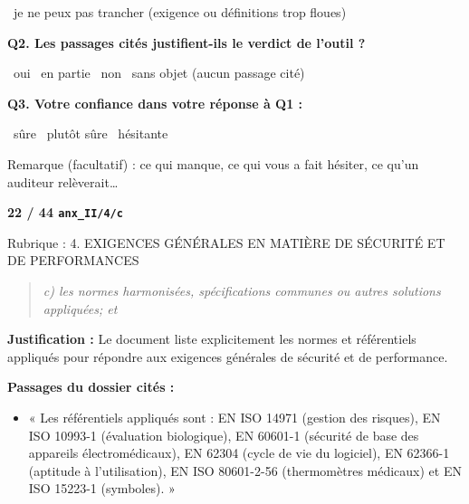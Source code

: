 \documentclass[11pt,a4paper]{article}
\newcommand{\rub}[1]{\par\medskip{\bfseries\color{gris}#1}\par}
\begin{document}
\begin{Form}
\CheckBox[name=u21_indecis,width=1.05em,height=1.05em,bordercolor={0 0 0},borderwidth=1]{}~je ne peux pas trancher (exigence ou définitions trop floues)\par
\textbf{Q2. Les passages cités justifient-ils le verdict de l'outil ?}\par
\CheckBox[name=u21_cit_oui,width=1.05em,height=1.05em,bordercolor={0 0 0},borderwidth=1]{}~oui \quad \CheckBox[name=u21_cit_partiel,width=1.05em,height=1.05em,bordercolor={0 0 0},borderwidth=1]{}~en partie \quad \CheckBox[name=u21_cit_non,width=1.05em,height=1.05em,bordercolor={0 0 0},borderwidth=1]{}~non \quad \CheckBox[name=u21_cit_sans,width=1.05em,height=1.05em,bordercolor={0 0 0},borderwidth=1]{}~sans objet (aucun passage cité)\par
\textbf{Q3. Votre confiance dans votre réponse à Q1 :}\par
\CheckBox[name=u21_conf_sure,width=1.05em,height=1.05em,bordercolor={0 0 0},borderwidth=1]{}~sûre \quad \CheckBox[name=u21_conf_plutot,width=1.05em,height=1.05em,bordercolor={0 0 0},borderwidth=1]{}~plutôt sûre \quad \CheckBox[name=u21_conf_hesitante,width=1.05em,height=1.05em,bordercolor={0 0 0},borderwidth=1]{}~hésitante\par
Remarque (facultatif) : ce qui manque, ce qui vous a fait hésiter, ce qu'un auditeur relèverait\ldots\par
\TextField[name=u21_note,multiline=true,width=\linewidth,height=2.2cm,bordercolor={0.6 0.6 0.6},borderwidth=0.5]{}
\newpage
{\Large\bfseries 22 / 44 \quad \texttt{anx\_II/4/c}}\par
{\small\color{gris} Rubrique : 4. EXIGENCES GÉNÉRALES EN MATIÈRE DE SÉCURITÉ ET DE PERFORMANCES}\par
\rub{L'exigence}
\begin{quote}\itshape c) les normes harmonisées, spécifications communes ou autres solutions appliquées; et\end{quote}
\rub{La réponse de l'outil : conforme}
\textbf{Justification :} Le document liste explicitement les normes et référentiels appliqués pour répondre aux exigences générales de sécurité et de performance.\par
\textbf{Passages du dossier cités :}
\begin{itemize}
\item « Les référentiels appliqués sont : EN ISO 14971 (gestion des risques), EN ISO 10993-1 (évaluation biologique), EN 60601-1 (sécurité de base des appareils électromédicaux), EN 62304 (cycle de vie du logiciel), EN 62366-1 (aptitude à l'utilisation), EN ISO 80601-2-56 (thermomètres médicaux) et EN ISO 15223-1 (symboles). »

\end{itemize}
\end{Form}
\end{document}
